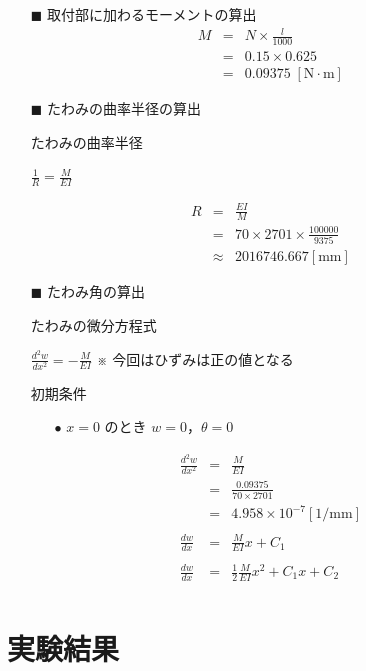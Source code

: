 \documentclass[twocolumn,a4j]{jsarticle}
\begin{document}
\begin{itemize}
    \item [$\blacksquare$] 取付部に加わるモーメントの算出
    \begin{eqnarray*}
        M &=& N × \frac{l}{1000}\\
        &=& 0.15 × 0.625\\
        &=& 0.09375 \;\left[\mathrm{N \cdot m}\right]
    \end{eqnarray*}
    \item [$\blacksquare$] たわみの曲率半径の算出
    \begin{itembox}[l]{たわみの曲率半径}
        \begin{center}
            $\displaystyle \frac{1}{R} = \frac{M}{EI}$
        \end{center}
    \end{itembox}
    \begin{eqnarray*}
        R &=& \frac{EI}{M}\\
        &=& 70 × 2701 × \frac{100000}{9375}\\
        &\approx& 2016746.667 \left[\mathrm{mm}\right]
    \end{eqnarray*}
    \item [$\blacksquare$] たわみ角の算出
    \begin{itembox}[l]{たわみの微分方程式}
            \begin{center}
                $\displaystyle \frac{d^2w}{dx^2}=-\frac{M}{EI}$
                ※ 今回はひずみは正の値となる
            \end{center}
    \end{itembox}
    \begin{itembox}[l]{初期条件}
    \begin{itemize}
        \item [$\bullet$] $x=0$ のとき $w=0$，$\theta =0$
    \end{itemize}
    \end{itembox}
    \begin{eqnarray*}
        \frac{d^2w}{dx^2}&=&\frac{M}{EI}\\
        &=&\frac{0.09375}{70 × 2701}\\
        &=& 4.958 × 10^{-7} \left[\mathrm{1/mm}\right]\\ \\
        \frac{dw}{dx} &=& \frac{M}{EI} x + C_1\\ \\
        \frac{dw}{dx} &=& \frac{1}{2} \frac{M}{EI} x^2 + C_1x + C_2\\
    \end{eqnarray*}
\end{itemize}
\section{実験結果}
\end{document}
